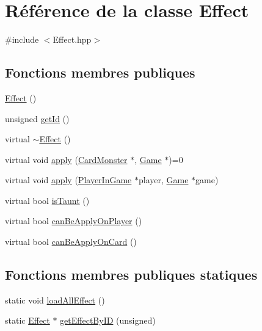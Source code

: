 \hypertarget{classEffect}{}\section{Référence de la classe Effect}
\label{classEffect}


{\ttfamily \#include $<$Effect.\+hpp$>$}

\subsection*{Fonctions membres publiques}
\begin{DoxyCompactItemize}
\item 
\hyperlink{classEffect_a4dae74244f59936a49847da9217b4126}{Effect} ()
\item 
unsigned \hyperlink{classEffect_ada9f548c745354c9df6fdc41db03a1fc}{get\+Id} ()
\item 
virtual \hyperlink{classEffect_ab0f471df484d3ef351b704fef39a7072}{$\sim$\+Effect} ()
\item 
virtual void \hyperlink{classEffect_a0300c9769c1fa800e6177639d46f8a30}{apply} (\hyperlink{classCardMonster}{Card\+Monster} $\ast$, \hyperlink{classGame}{Game} $\ast$)=0
\item 
virtual void \hyperlink{classEffect_a74ebf3cf61dd27353507e3fac66bbbfd}{apply} (\hyperlink{classPlayerInGame}{Player\+In\+Game} $\ast$player, \hyperlink{classGame}{Game} $\ast$game)
\item 
virtual bool \hyperlink{classEffect_adb7655cc87e0602f6f608103ff388a6f}{is\+Taunt} ()
\item 
virtual bool \hyperlink{classEffect_a23e7eba966b28f051ec12865f53cd092}{can\+Be\+Apply\+On\+Player} ()
\item 
virtual bool \hyperlink{classEffect_a73276d4552dbf661802db1cae63fdb59}{can\+Be\+Apply\+On\+Card} ()
\end{DoxyCompactItemize}
\subsection*{Fonctions membres publiques statiques}
\begin{DoxyCompactItemize}
\item 
static void \hyperlink{classEffect_ae185e5fd1219ac1d7ffbcd51d0ace58c}{load\+All\+Effect} ()
\item 
static \hyperlink{classEffect}{Effect} $\ast$ \hyperlink{classEffect_a6f3f6d50f4cd368bbd740d4d9b26b93f}{get\+Effect\+By\+I\+D} (unsigned)
\end{DoxyCompactItemize}


